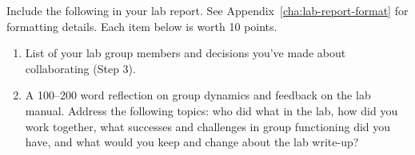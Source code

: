 Include the following in your lab report. See Appendix~\ref{cha:lab-report-format} for formatting details. Each item below is worth 10 points.

\begin{enumerate}
	\item List of your lab group members and decisions you've made about collaborating (Step 3).
	
	\item A 100--200 word reflection on group dynamics and feedback on the lab manual. Address the following topics: who did what in the lab, how did you work together, what successes and challenges in group functioning did you have, and what would you keep and change about the lab write-up?
\end{enumerate}